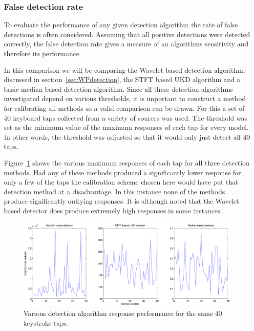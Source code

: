 \subsubsection{False detection rate}

To evaluate the performance of any given detection algorithm the rate of false detections is often considered. Assuming that all positive detections were detected correctly, the false detection rate gives a measure of an algorithms sensitivity and therefore its performance.

In this comparison we will be comparing the Wavelet based detection algorithm, discussed in section~\ref{sec:WPdetection}, the STFT based UKD algorithm\cite{Subramanya2007} and a basic median based detection algorithm. Since all these detection algorithms investigated depend on various thresholds, it is important to construct a method for calibrating all methods so a valid comparison can be drawn. For this a set of 40 keyboard taps collected from a variety of sources was used. The threshold was set as the minimum value of the maximum responses of each tap for every model. In other words, the threshold was adjusted so that it would only just detect all 40 taps.

Figure~\ref{fig:maxes.pdf} shows the various maximum responses of each tap for all three detection methods. Had any of these methods produced a significantly lower response for only a few of the taps the calibration scheme chosen here would have put that detection method at a disadvantage. In this instance none of the methods produce significantly outlying responses. It is although noted that the Wavelet based detector does produce extremely high responses in some instances.

\begin{figure} %
\centering
\includegraphics[width=120mm]{maxes.pdf}
\caption{Various detection algorithm response performance for the same 40 keystroke taps.}
\label{fig:maxes.pdf}
\end{figure}

